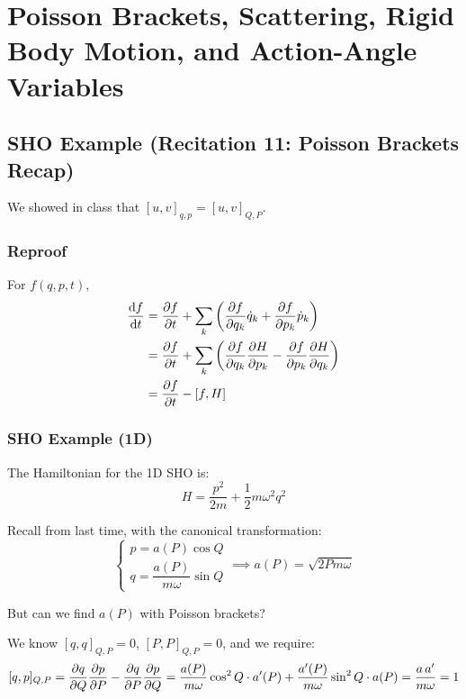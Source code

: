 
\chapter{Poisson Brackets, Scattering, Rigid Body Motion, and Action-Angle Variables}

\section{SHO Example (Recitation 11: Poisson Brackets Recap)}

We showed in class that $[u,v]_{q,p} = [u,v]_{Q,P}$.

\subsection*{Reproof}

For $f(q,p,t)$,
\begin{align*}
    \dv{f}{t} &= \pdv{f}{t} + \sum_k \left(\pdv{f}{q_k}\dot{q}_k + \pdv{f}{p_k}\dot{p}_k\right) \\
              &= \pdv{f}{t} + \sum_k \left(\pdv{f}{q_k}\pdv{H}{p_k} - \pdv{f}{p_k}\pdv{H}{q_k}\right) \\
              &= \pdv{f}{t} - [f, H]
\end{align*}

\subsection{SHO Example (1D)}

The Hamiltonian for the 1D SHO is:
\[
    H = \frac{p^2}{2m} + \frac{1}{2}m\omega^2 q^2
\]

Recall from last time, with the canonical transformation:
\[
    \begin{cases}
        p = a(P)\cos Q \\
        q = \dfrac{a(P)}{m\omega}\sin Q
    \end{cases}
    \implies a(P) = \sqrt{2Pm\omega}
\]

But can we find $a(P)$ with Poisson brackets?

We know $[q,q]_{Q,P} = 0$, $[P,P]_{Q,P} = 0$, and we require:
\[
    [q,p]_{Q,P} = \pdv{q}{Q}\pdv{p}{P} - \pdv{q}{P}\pdv{p}{Q}
    = \frac{a(P)}{m\omega}\cos^2 Q \cdot a'(P) + \frac{a'(P)}{m\omega}\sin^2 Q \cdot a(P)
    = \frac{a\,a'}{m\omega} = 1
\]

